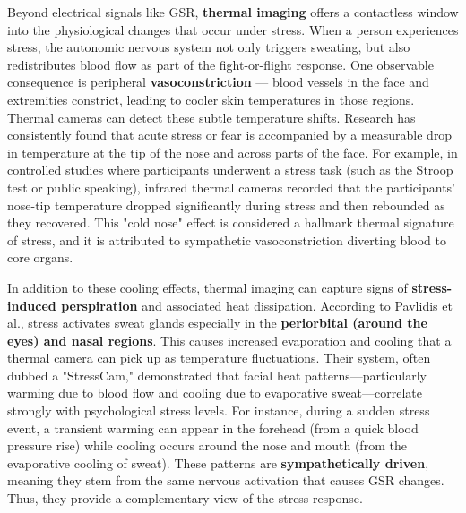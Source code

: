 \documentclass[11pt,a4paper]{report}
\begin{document}
Beyond electrical signals like GSR, \textbf{thermal imaging} offers a contactless window into the physiological changes that occur under stress. When a person experiences stress, the autonomic nervous system not only triggers sweating, but also redistributes blood flow as part of the fight-or-flight response. One observable consequence is peripheral \textbf{vasoconstriction} — blood vessels in the face and extremities constrict, leading to cooler skin temperatures in those regions. Thermal cameras can detect these subtle temperature shifts. Research has consistently found that acute stress or fear is accompanied by a measurable drop in temperature at the tip of the nose and across parts of the face\cite{ContactlessStressThermal2022}. For example, in controlled studies where participants underwent a stress task (such as the Stroop test or public speaking), infrared thermal cameras recorded that the participants' nose-tip temperature dropped significantly during stress and then rebounded as they recovered\cite{ContactlessStressThermal2022}. This "cold nose" effect is considered a hallmark thermal signature of stress, and it is attributed to sympathetic vasoconstriction diverting blood to core organs.

In addition to these cooling effects, thermal imaging can capture signs of \textbf{stress-induced perspiration} and associated heat dissipation. According to Pavlidis et al., stress activates sweat glands especially in the \textbf{periorbital (around the eyes) and nasal regions}. This causes increased evaporation and cooling that a thermal camera can pick up as temperature fluctuations\cite{DriverStressThermal2020}. Their system, often dubbed a "StressCam," demonstrated that facial heat patterns—particularly warming due to blood flow and cooling due to evaporative sweat—correlate strongly with psychological stress levels\cite{DriverStressThermal2020}. For instance, during a sudden stress event, a transient warming can appear in the forehead (from a quick blood pressure rise) while cooling occurs around the nose and mouth (from the evaporative cooling of sweat). These patterns are \textbf{sympathetically driven}, meaning they stem from the same nervous activation that causes GSR changes\cite{DriverStressThermal2020}. Thus, they provide a complementary view of the stress response.
\end{document}
